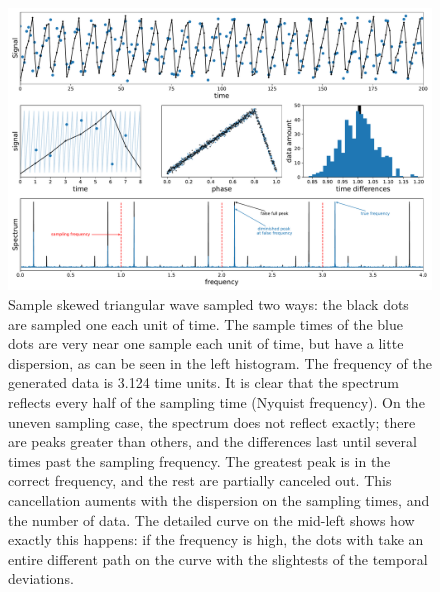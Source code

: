 \begin{figure}
	\centering
	\includegraphics[width=\textwidth]{img/uneven_advantage.pdf}
	\caption[Comparison between even and uneven sampled signal past the nyquist limit]{
		Sample skewed triangular wave sampled two ways: the black dots are sampled one each unit of time.
		The sample times of the blue dots are very near one sample each unit of time, but have a litte dispersion,
		as can be seen in the left histogram.
		The frequency of the generated data is 3.124 time units.
		It is clear that the spectrum reflects every half of the sampling time (Nyquist frequency). 
		On the uneven sampling case, the spectrum does not reflect exactly; there are peaks greater than others,
		and the differences last until several times past the sampling frequency.
		The greatest peak is in the correct frequency, and the rest are partially canceled out.
		This cancellation auments with the dispersion on the sampling times, and the number of data.
		The detailed curve on the mid-left shows how exactly this happens: if the frequency is high, the dots with take an entire different path on the curve with the slightests of the temporal deviations.
	}
	\label{fig:uneven-advantage}
\end{figure}



